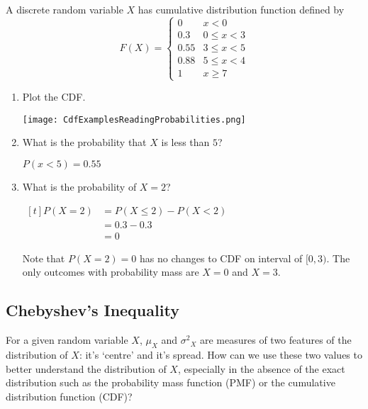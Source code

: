 \begin{example}
    A discrete random variable $X$ has cumulative distribution function defined by
    $$F(X) = \begin{cases}
        0    & x < 0       \\
        0.3  & 0 \le x < 3 \\
        0.55 & 3 \le x < 5 \\
        0.88 & 5 \le x < 4 \\
        1    & x \ge 7
    \end{cases}$$

    \begin{enumerate}[label=\alph*)]
        \item Plot the CDF. 
        
        \begin{center} \texttt{[image: CdfExamplesReadingProbabilities.png]} \end{center}

        \item What is the probability that $X$ is less than $5$?

        $P(x < 5) = 0.55$

        \item What is the probability of $X = 2$?

        $\begin{aligned}[t]
            P(X = 2) & = P(X \le 2) - P(X < 2) \\
                     & = 0.3 - 0.3             \\
                     & = 0
        \end{aligned}$

        Note that $P(X = 2) = 0$ has no changes to CDF on interval of $[0, 3)$. The only outcomes with probability mass are $X = 0$ and $X = 3$. 
    \end{enumerate}
\end{example}

\subsection{Chebyshev's Inequality}

For a given random variable $X$, $\mu_X$ and ${\sigma^2}_X$ are measures of two features of the distribution of $X$: it's `centre' and it's spread. How can we use these two values to better understand the distribution of $X$, especially in the absence of the exact distribution such as the probability mass function (PMF) or the cumulative distribution function (CDF)?

